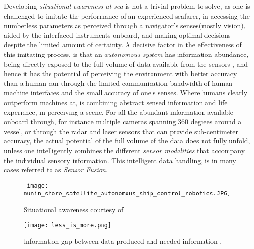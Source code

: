 Developing \emph{situational awareness at sea} is not a trivial problem to solve, as one is challenged to imitate the performance of an experienced seafarer, in accessing the numberless parameters as perceived through a navigator's senses(mostly vision), aided by the interfaced instruments onboard, and making optimal decisions despite the limited amount of certainty. A decisive factor in the effectiveness of this imitating process, is that  an \emph{autonomous system} has information abundance, being directly exposed to the full volume of data available from the sensors , and hence it has the potential of perceiving the environment with better accuracy than a human can through the limited communication bandwidth of human-machine interfaces and the small accuracy of one's senses. Where humans clearly outperform machines at, is combining abstract sensed information and life experience, in perceiving a scene. For all the abundant information available onboard through, for instance multiple cameras spanning 360 degrees around a vessel, or through the radar and laser sensors that can provide sub-centimeter accuracy, the actual potential of the full volume of the data does not  fully unfold, unless one intelligently combines the different \emph{sensor modalities} that accompany the individual sensory information. This intelligent data handling, is in many cases referred to as \emph{Sensor Fusion}.


\begin{figure}[H]
	\centering
	\texttt{[image: munin\_shore\_satellite\_autonomous\_ship\_control\_robotics.JPG]}
	\caption{Situational awareness courtesy of  \cite{MUNIN}}
	\label{fig:situation}
\end{figure}



\begin{figure}[H]
	\centering
	\texttt{[image: less\_is\_more.png]}
	\caption{Information gap between data produced and needed information  \cite{Endsley1995}.}
	\label{fig:less_is_more}
\end{figure}

